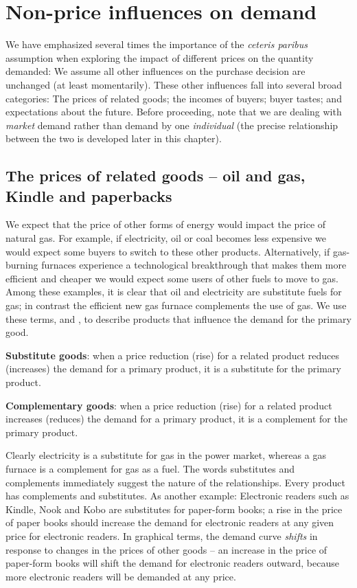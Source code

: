 \section{Non-price influences on demand}\label{sec:ch3sec4}

We have emphasized several times the importance of the \textit{ceteris
paribus} assumption when exploring the impact of different prices on the
quantity demanded: We assume all other influences on the purchase decision
are unchanged (at least momentarily). These other influences fall into
several broad categories: The prices of related goods; the incomes of
buyers; buyer tastes; and expectations about the future. Before proceeding,
note that we are dealing with \textit{market} demand rather than demand by
one \textit{individual} (the precise relationship between the two is
developed later in this chapter).

\subsection*{The prices of related goods -- oil and gas, Kindle and paperbacks}

We expect that the price of other forms of energy would impact the price of
natural gas. For example, if electricity, oil or coal becomes less expensive
we would expect some buyers to switch to these other products.
Alternatively, if gas-burning furnaces experience a technological
breakthrough that makes them more efficient and cheaper we would expect some
users of other fuels to move to gas. Among these examples, it is clear that
oil and electricity are substitute fuels for gas; in contrast the efficient
new gas furnace complements the use of gas. We use these terms, %
 and , to describe
products that influence the demand for the primary good.

\begin{DefBox}
\textbf{Substitute goods}: when a price reduction (rise) for a related product reduces (increases) the demand for a primary product, it is a substitute for the primary product.

\textbf{Complementary goods}: when a price reduction (rise) for a related product increases (reduces) the demand for a primary product, it is a complement for the primary product.
\end{DefBox}

Clearly electricity is a substitute for gas in the power market, whereas a
gas furnace is a complement for gas as a fuel. The words substitutes and
complements immediately suggest the nature of the relationships. Every
product has complements and substitutes. As another example: Electronic
readers such as Kindle, Nook and Kobo are substitutes for paper-form books;
a rise in the price of paper books should increase the demand for electronic
readers at any given price for electronic readers. In graphical terms, the
demand curve \textit{shifts} in response to changes in the prices of other
goods -- an increase in the price of paper-form books will shift the demand
for electronic readers outward, because more electronic readers will be
demanded at any price.

